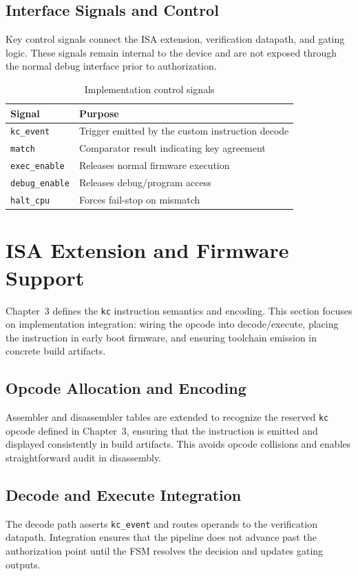 \subsection{Interface Signals and Control}
Key control signals connect the ISA extension, verification datapath, and gating logic.
These signals remain internal to the device and are not exposed through the normal debug
interface prior to authorization.

\begin{table}[H]
  \centering
  \caption{Implementation control signals}
  \label{tab:impl-signals}
  \begin{tabular}{@{}p{3.8cm}p{8.2cm}@{}}
    \toprule
    \textbf{Signal} & \textbf{Purpose} \\
    \midrule
    \texttt{kc\_event} & Trigger emitted by the custom instruction decode \\
    \texttt{match} & Comparator result indicating key agreement \\
    \texttt{exec\_enable} & Releases normal firmware execution \\
    \texttt{debug\_enable} & Releases debug/program access \\
    \texttt{halt\_cpu} & Forces fail-stop on mismatch \\
    \bottomrule
  \end{tabular}
\end{table}

\section{ISA Extension and Firmware Support}
Chapter~3 defines the \texttt{kc} instruction semantics and encoding. This section focuses on
implementation integration: wiring the opcode into decode/execute, placing the instruction in
early boot firmware, and ensuring toolchain emission in concrete build artifacts.

\subsection{Opcode Allocation and Encoding}
Assembler and disassembler tables are extended to recognize the reserved \texttt{kc} opcode
defined in Chapter~3, ensuring that the instruction is emitted and displayed consistently in
build artifacts. This avoids opcode collisions and enables straightforward audit in disassembly.

\subsection{Decode and Execute Integration}
The decode path asserts \texttt{kc\_event} and routes operands to the verification datapath.
Integration ensures that the pipeline does not advance past the authorization point until the
FSM resolves the decision and updates gating outputs.

